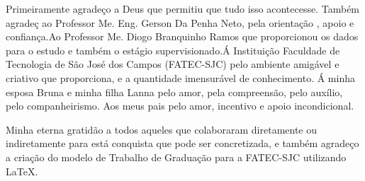 \begin{agradecimentos}
\par Primeiramente agrade\c{c}o a Deus que permitiu que tudo isso acontecesse.
Também agrade\c{c} ao Professor Me. Eng. Gerson Da Penha Neto, pela orienta\c{c}\~ao , apoio e  confian\c{c}a.Ao Professor Me. Diogo Branquinho Ramos que proporcionou os dados para o estudo e tamb\'em o est\'agio supervisionado.\'A Institui\c{c}\~ao Faculdade de Tecnologia de S\~ao Jos\'e dos Campos (FATEC-SJC) pelo ambiente  amig\'avel  e criativo  que proporciona, e a quantidade imensur\'avel de conhecimento. \'A minha esposa Bruna e minha filha Lanna pelo amor, pela compreens\~ao, pelo aux\'ilio, pelo companheirismo.  Aos meus pais pelo amor, incentivo  e  apoio incondicional.
\par Minha eterna gratid\~ao  a  todos aqueles que colaboraram diretamente ou indiretamente para est\'a conquista que pode ser concretizada,  e  tamb\'em  agradeço a cria\c{c}\~ao do modelo de Trabalho de Gradua\c{c}\~ao para a FATEC-SJC utilizando \LaTeX.

\end{agradecimentos}